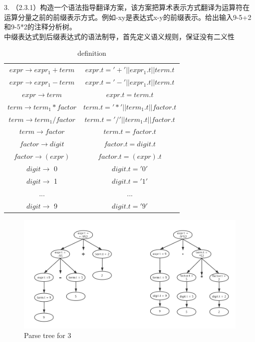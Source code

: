\documentclass[a4paper， 16pt]{article}
\begin{document}
\begin{flushleft}
3. （2.3.1）构造一个语法指导翻译方案，该方案把算术表示方式翻译为运算符在运算分量之前的前缀表示方式。例如-xy是表达式x-y的前缀表示。给出输入9-5+2和9-5*2的注释分析树。\\
中缀表达式到后缀表达式的语法制导，首先定义语义规则，保证没有二义性\\
\begin{table}[H]
\centering
\caption{definition}
\begin{tabular}{c|c}
\hline
$expr \rightarrow expr_1 + term$&$expr.t = '+' || expr_1.t || term.t$\\
$expr \rightarrow expr_1 - term$&$expr.t = '-' || expr_1.t || term.t$\\
$expr \rightarrow term$&$expr.t = term.t$\\

$term \rightarrow term_1 * factor$&$term.t = '*' || term_1.t || factor.t$\\
$term \rightarrow term_1 / factor$&$term.t = '/' || term_1.t || factor.t$\\
$term \rightarrow factor$&$term.t = factor.t$\\
$factor \rightarrow digit $&$factor.t = digit.t$\\
$factor \rightarrow (expr) $&$factor.t = (expr).t$\\
$digit \rightarrow$ 0 & $digit.t = '0'$\\
$digit \rightarrow$ 1 & $digit.t = '1'$\\
... & ...\\
$digit \rightarrow$ 9 & $digit.t = '9'$\\
\hline

\end{tabular}
\end{table}

\begin{figure}[H]
\centering
\includegraphics[scale=0.6]{chapter2_hw1_5}
\caption{Parse tree for 3}
\label{f3}
\end{figure}
\end{flushleft}
\end{document}
